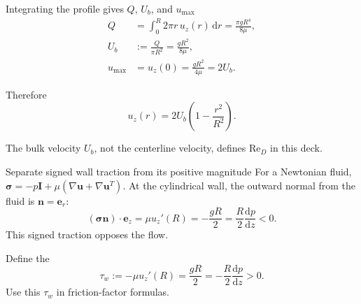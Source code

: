 \documentclass[aspectratio=169,11pt]{beamer}
\newcommand{\Rey}{\mathrm{Re}}
\newcommand{\uu}{\bm{u}}
\begin{document}
\begin{frame}{Integrating the profile gives $Q$, $U_b$, and $u_{\max}$}
\begin{align*}
  Q&=\int_0^R2\pi r\,u_z(r)\,\mathrm dr
     =\frac{\pi gR^4}{8\mu},\\
  U_b&:=\frac{Q}{\pi R^2}=\frac{gR^2}{8\mu},\\
  u_{\max}&=u_z(0)=\frac{gR^2}{4\mu}=2U_b.
\end{align*}

Therefore
\[
  u_z(r)=2U_b\left(1-\frac{r^2}{R^2}\right).
\]

\begin{punchbox}
The bulk velocity $U_b$, not the centerline velocity, defines $\Rey_D$ in this deck.
\end{punchbox}
\end{frame}

\begin{frame}{Separate signed wall traction from its positive magnitude}
For a Newtonian fluid, $\bm\sigma=-p\bm I+\mu(\nabla\uu+\nabla\uu^T)$.
At the cylindrical wall, the outward normal from the fluid is $\bm n=\bm e_r$:
\[
  (\bm\sigma\bm n)\cdot\bm e_z
  =\mu u_z'(R)
  =-\frac{gR}{2}
  =\frac R2\frac{\mathrm dp}{\mathrm dz}<0.
\]
This signed traction opposes the flow.

Define the 
\[
  \boxed{\tau_w:=-\mu u_z'(R)
  =\frac{gR}{2}
  =-\frac R2\frac{\mathrm dp}{\mathrm dz}>0.}
\]
Use this $\tau_w$ in friction-factor formulas.
\end{frame}
\end{document}

